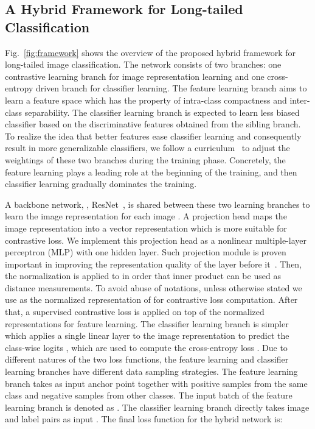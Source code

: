 \documentclass[final]{cvpr}
\begin{document}
\subsection{A Hybrid Framework for Long-tailed Classification}
\label{sec:overview}
Fig.~\ref{fig:framework} shows the overview of the proposed hybrid framework for long-tailed image classification. The network consists of two branches: one contrastive learning branch for image representation learning and one cross-entropy driven branch for classifier learning. The feature learning branch aims to learn a feature space which has the property of intra-class compactness and inter-class separability. The classifier learning branch is expected to learn less biased classifier based on the discriminative features obtained from the sibling branch. To realize the idea that better features ease classifier learning and consequently result in more generalizable classifiers, we follow a curriculum~\cite{BBN} to adjust the weightings of these two branches during the training phase. Concretely, the feature learning plays a leading role at the beginning of the training, and then classifier learning gradually dominates the training.

A backbone network, \eg, ResNet~\cite{resnet}, is shared between these two learning branches to learn the image representation  for each image . A projection head  maps the image representation  into a vector representation  which is more suitable for contrastive loss. We implement this projection head  as a nonlinear multiple-layer perceptron (MLP) with one hidden layer. Such projection module is proven important in improving the representation quality of the layer before it~\cite{simclr}. Then, the  normalization is applied to  in order that inner product can be used as distance measurements. To avoid abuse of notations, unless otherwise stated we use  as the normalized representation of  for contrastive loss computation. After that, a supervised contrastive loss  is applied on top of the normalized representations for feature learning.  The classifier learning branch is simpler which applies a single linear layer  to the image representation  to predict the class-wise logits , which are used to compute the cross-entropy loss . Due to different natures of the two loss functions, the feature learning and classifier learning branches have different data sampling strategies. The feature learning branch takes as input anchor point  together with positive samples  from the same class and negative samples  from other classes. The input batch of the feature learning branch is denoted as . The classifier learning branch directly takes image and label pairs as input . The final loss function for the hybrid network is: 
\end{document}
